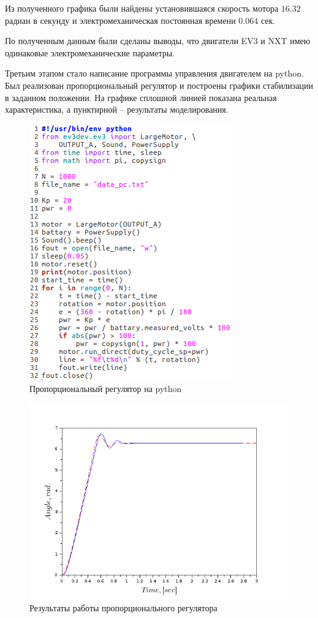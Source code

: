 \documentclass[a4paper,14pt]{extreport}
\begin{document}
	Из полученного графика были найдены установившаяся скорость мотора $16.32$ радиан в секунду и электромеханическая постоянная времени $0.064$ сек.
	
	По полученным данным были сделаны выводы, что двигатели EV3 и NXT имею одинаковые электромеханические параметры.
	
	Третьим этапом стало написание программы управления двигателем на python. Был реализован пропорциональный регулятор и построены графики стабилизации в заданном положении. На графике сплошной линией показана реальная характеристика, а пунктирной -- результаты моделирования.
	
	\begin{figure}[H]
		\center\includegraphics[width=0.5\linewidth]{listing1.png}
		\caption{Пропорциональный регулятор на python}
		\label{fig:scr1}
	\end{figure}
	\begin{figure}[H]
		\center\includegraphics[width=0.7\linewidth]{angle_time2.png}
		\caption{Результаты работы пропорционального регулятора}
		\label{fig:scr1}
	\end{figure}
	
\end{document}
